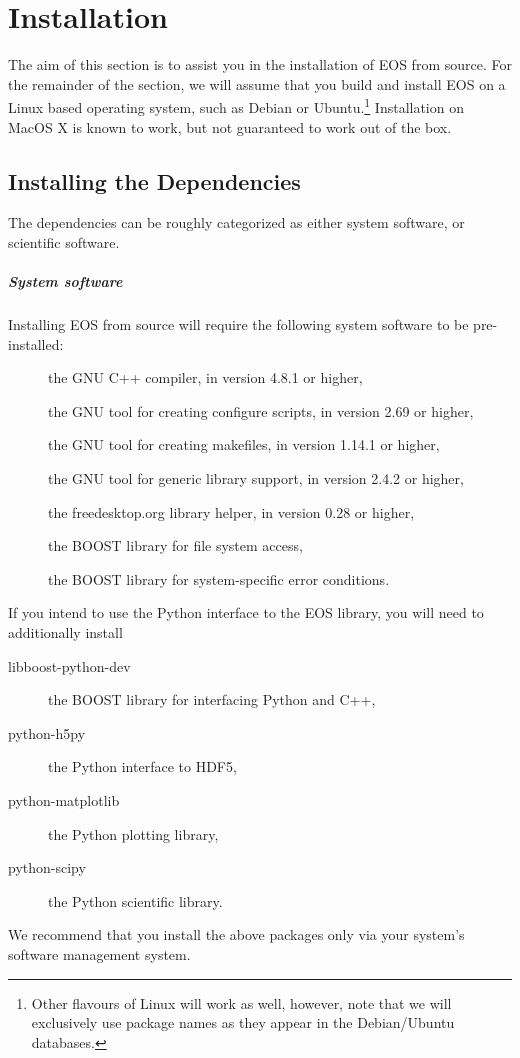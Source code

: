 \chapter{Installation}

The aim of this section is to assist you in the installation of EOS
from source. For the remainder of the section, we will assume that you
build and install EOS on a Linux based operating system, such as Debian
or Ubuntu.\footnote{%
    Other flavours of Linux will work as well, however, note that
    we will exclusively use package names as they appear in the Debian/Ubuntu
     databases.
}
Installation on MacOS X is known to work, but not guaranteed to work out
of the box.

\section{Installing the Dependencies}

The dependencies can be roughly categorized as either system software, or
scientific software.

\paragraph{System software} Installing EOS from source will require the following system
software to be pre-installed:
\begin{description}
    \item[] the GNU C++ compiler, in version 4.8.1 or higher,
    \item[] the GNU tool for creating configure scripts, in version 2.69 or higher,
    \item[] the GNU tool for creating makefiles, in version 1.14.1 or higher,
    \item[] the GNU tool for generic library support, in version 2.4.2 or higher,
    \item[] the freedesktop.org library helper, in version 0.28 or higher,
    \item[] the BOOST library for file system access,
    \item[] the BOOST library for system-specific error conditions.
\end{description}
If you intend to use the Python \cite{Python} interface to the EOS library, you will need
to additionally install
\begin{description}
    \item[libboost-python-dev] the BOOST library for interfacing Python and C++,
    \item[python-h5py] the Python interface to HDF5,
    \item[python-matplotlib] the Python plotting library,
    \item[python-scipy] the Python scientific library.
\end{description}
We recommend that you install the above packages only via your system's software management system.

